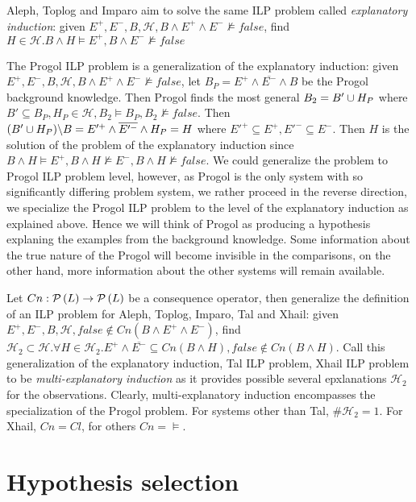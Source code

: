 Aleph, Toplog and Imparo aim to solve the same ILP problem called \emph{explanatory induction}:
given $E^{+}, E^{-}, B, \mathcal{H}, B \land E^{+} \land E^{-} \not\models false$, find $H \in \mathcal{H}. B \land H \models E^{+}, B \land E^{-} \not\models false$

The Progol ILP problem is a generalization of the explanatory induction: given $E^{+}, E^{-}, B, \mathcal{H}, B \land E^{+} \land E^{-} \not\models false$,
let $B_P=E^{+} \land \overline{E^{-}} \land B$ be the Progol background knowledge. Then Progol finds the most general $B_2 = B' \cup H_P$ where $B' \subseteq B_P, H_P \in \mathcal{H}, B_2 \models B_P, B_2 \not\models false$.
Then $(B' \cup H_P) \backslash B=E'^{+} \land \overline{E'^-} \land H_P = H$ where $E'^+ \subseteq E^+, E'^- \subseteq E^-$. Then $H$ is the solution of the problem of the explanatory induction since $B \land H \models E^{+}, B \land H \not\models E^{-}, B \land H \not\models false$. We could generalize the problem to Progol ILP problem level, however, as Progol is the only system with so significantly differing problem system, we rather proceed in the reverse direction, we specialize the Progol ILP problem to the level of the explanatory induction as explained above. Hence we will think of Progol as producing a hypothesis explaning the examples from the background knowledge. Some information about the true nature of the Progol will become invisible in the comparisons, on the other hand, more information about the other systems will remain available.

Let $Cn:\mathcal{P} \left({ L }\right) \to \mathcal{P} \left({ L }\right)$ be a consequence operator, then generalize the definition of an ILP problem for Aleph, Toplog, Imparo, Tal and Xhail:
given $E^{+}, E^{-}, B, \mathcal{H}, false \not\in Cn(B \land E^{+} \land E^{-})$,
find $\mathcal{H}_2 \subset \mathcal{H}. \forall H \in \mathcal{H}_2. E^{+} \land \overline{E^{-}} \subseteq Cn(B \land H), false \not\in Cn(B \land H)$. Call this generalization of the explanatory induction, Tal ILP problem, Xhail ILP problem to be \emph{multi-explanatory induction} as it provides possible several epxlanations $\mathcal{H}_2$ for the observations. Clearly, multi-explanatory induction encompasses the specialization of the Progol problem. For systems other than Tal, $\#\mathcal{H}_2=1$. For Xhail, $Cn=Cl$, for others $Cn=\models$.

\section{Hypothesis selection}

